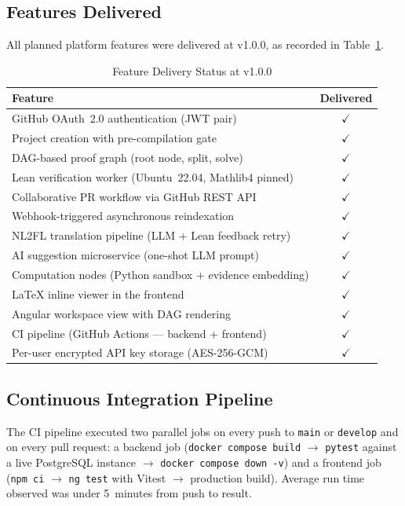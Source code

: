 \documentclass[conference]{IEEEtran}
\begin{document}
\subsection{Features Delivered}
\label{subsec:features}

All planned platform features were delivered at v1.0.0, as recorded in
Table~\ref{tab:features}.

\begin{table}[htbp]
  \caption{Feature Delivery Status at v1.0.0}
  \label{tab:features}
  \centering
  \begin{tabular}{lc}
    \hline
    \textbf{Feature} & \textbf{Delivered} \\
    \hline
    GitHub OAuth~2.0 authentication (JWT pair) & $\checkmark$ \\
    Project creation with pre-compilation gate & $\checkmark$ \\
    DAG-based proof graph (root node, split, solve) & $\checkmark$ \\
    Lean verification worker (Ubuntu~22.04, Mathlib4 pinned) & $\checkmark$ \\
    Collaborative PR workflow via GitHub REST API & $\checkmark$ \\
    Webhook-triggered asynchronous reindexation & $\checkmark$ \\
    NL2FL translation pipeline (LLM + Lean feedback retry) & $\checkmark$ \\
    AI suggestion microservice (one-shot LLM prompt) & $\checkmark$ \\
    Computation nodes (Python sandbox + evidence embedding) & $\checkmark$ \\
    \LaTeX{} inline viewer in the frontend & $\checkmark$ \\
    Angular workspace view with DAG rendering & $\checkmark$ \\
    CI pipeline (GitHub Actions --- backend + frontend) & $\checkmark$ \\
    Per-user encrypted API key storage (AES-256-GCM) & $\checkmark$ \\
    \hline
  \end{tabular}
\end{table}

\subsection{Continuous Integration Pipeline}
\label{subsec:ci}

The CI pipeline executed two parallel jobs on every push to \texttt{main}
or \texttt{develop} and on every pull request: a backend job
(\texttt{docker compose build} $\to$ \texttt{pytest} against a live
PostgreSQL instance $\to$ \texttt{docker compose down -v}) and a frontend
job (\texttt{npm ci} $\to$ \texttt{ng test} with Vitest $\to$ production
build). Average run time observed was under 5~minutes from push to result.
\end{document}
